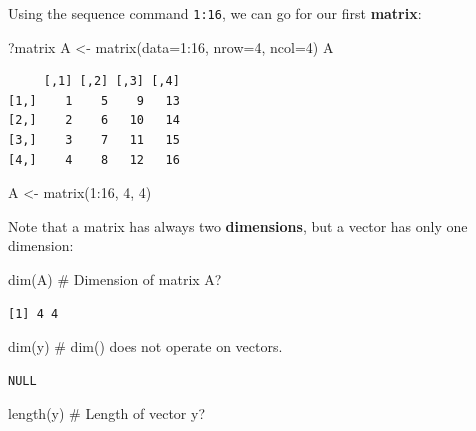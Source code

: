\documentclass[
  letterpaper,
  DIV=11,
  numbers=noendperiod]{scrreprt}
\newenvironment{Shaded}{\begin{snugshade}}{\end{snugshade}}
\newcommand{\AttributeTok}[1]{\textcolor[rgb]{0.40,0.45,0.13}{#1}}
\newcommand{\CommentTok}[1]{\textcolor[rgb]{0.37,0.37,0.37}{#1}}
\newcommand{\DecValTok}[1]{\textcolor[rgb]{0.68,0.00,0.00}{#1}}
\newcommand{\FunctionTok}[1]{\textcolor[rgb]{0.28,0.35,0.67}{#1}}
\newcommand{\NormalTok}[1]{\textcolor[rgb]{0.00,0.23,0.31}{#1}}
\newcommand{\OtherTok}[1]{\textcolor[rgb]{0.00,0.23,0.31}{#1}}
\newcommand{\SpecialCharTok}[1]{\textcolor[rgb]{0.37,0.37,0.37}{#1}}
\theoremstyle{definition}
\theoremstyle{plain}
\theoremstyle{plain}
\theoremstyle{remark}
\begin{document}
Using the sequence command \texttt{1:16}, we can go for our first
\textbf{matrix}:

\begin{Shaded}
\begin{Highlighting}[]
\NormalTok{?matrix}
\NormalTok{A }\OtherTok{\textless{}{-}} \FunctionTok{matrix}\NormalTok{(}\AttributeTok{data=}\DecValTok{1}\SpecialCharTok{:}\DecValTok{16}\NormalTok{, }\AttributeTok{nrow=}\DecValTok{4}\NormalTok{, }\AttributeTok{ncol=}\DecValTok{4}\NormalTok{)}
\NormalTok{A}
\end{Highlighting}
\end{Shaded}

\begin{verbatim}
     [,1] [,2] [,3] [,4]
[1,]    1    5    9   13
[2,]    2    6   10   14
[3,]    3    7   11   15
[4,]    4    8   12   16
\end{verbatim}

\begin{Shaded}
\begin{Highlighting}[]
\NormalTok{A }\OtherTok{\textless{}{-}} \FunctionTok{matrix}\NormalTok{(}\DecValTok{1}\SpecialCharTok{:}\DecValTok{16}\NormalTok{, }\DecValTok{4}\NormalTok{, }\DecValTok{4}\NormalTok{)}
\end{Highlighting}
\end{Shaded}

Note that a matrix has always two \textbf{dimensions}, but a vector has
only one dimension:

\begin{Shaded}
\begin{Highlighting}[]
\FunctionTok{dim}\NormalTok{(A)    }\CommentTok{\# Dimension of matrix A?}
\end{Highlighting}
\end{Shaded}

\begin{verbatim}
[1] 4 4
\end{verbatim}

\begin{Shaded}
\begin{Highlighting}[]
\FunctionTok{dim}\NormalTok{(y)    }\CommentTok{\# dim() does not operate on vectors.}
\end{Highlighting}
\end{Shaded}

\begin{verbatim}
NULL
\end{verbatim}

\begin{Shaded}
\begin{Highlighting}[]
\FunctionTok{length}\NormalTok{(y) }\CommentTok{\# Length of vector y?}
\end{Highlighting}
\end{Shaded}
\end{document}
